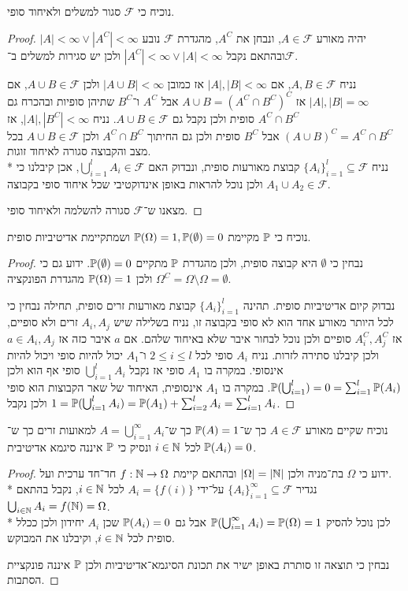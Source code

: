 \Subquestion{}
נוכיח כי $\mathcal{F}$ סגור למשלים ולאיחוד סופי.
\begin{proof}
	יהיה מאורע $A \in \mathcal{F}$, ונבחן את $A^C$, מהגדרת $\mathcal{F}$ נובע $|A| < \infty \lor |A^C| < \infty$ ובהתאם נקבל $|A^C| < \infty \lor |A| < \infty$ ולכן יש סגירות למשלים ב־$\mathcal{F}$.

	נניח $A, B \in \mathcal{F}$, אם $|A|, |B| < \infty$ אז כמובן $|A \cup B| < \infty$ ולכן $A \cup B \in \mathcal{F}$,
	אם $|A|, |B| = \infty$ אז $A \cup B = {(A^C \cap B^C)}^C$ אבל $A^C$ ו־$B^C$ שתיהן סופיות ובהכרח גם $A^C \cap B^C$ סופית ולכן נקבל גם $A \cup B \in \mathcal{F}$.
	נניח $|A|, |B^C| < \infty$, אז ${(A \cup B)}^C = A^C \cap B^C$ אבל $B^C$ סופית ולכן גם החיתוך $A^C \cap B^C$ ולכן $A \cup B \in \mathcal{F}$ בכל מצב והקבוצה סגורה לאיחוד זוגות. \\*
	נניח ${\{A_i\}}_{i = 1}^l \subseteq \mathcal{F}$ קבוצת מאורעות סופית, ונבדוק האם $\bigcup_{i = 1}^l A_i \in \mathcal{F}$, אכן קיבלנו כי $A_1 \cup A_2 \in \mathcal{F}$ ולכן נוכל להראות באופן אינדוקטיבי שכל איחוד סופי בקבוצה.

	מצאנו ש־$\mathcal{F}$ סגורה להשלמה ולאיחוד סופי.
\end{proof}

\Subquestion{}
נוכיח כי $\mathbb{P}$ מקיימת $\mathbb{P}(\Omega) = 1, \mathbb{P}(\emptyset) = 0$ ושמתקיימת אדיטיביות סופית.
\begin{proof}
	נבחין כי $\emptyset$ היא קבוצה סופית, ולכן מהגדרת $\mathbb{P}$ מתקיים $\mathbb{P}(\emptyset) = 0$.
	ידוע גם כי $\Omega^C = \Omega \setminus \Omega = \emptyset$ ולכן $\mathbb{P}(\Omega) = 1$ מהגדרת הפונקציה.

	נבדוק קיום אדיטיביות סופית.
	תהינה ${\{A_i\}}_{i = 1}^l$ קבוצת מאורעות זרים סופית, תחילה נבחין כי לכל היותר מאורע אחד הוא לא סופי בקבוצה זו, נניח בשלילה שיש $A_i, A_j$ זרים ולא סופיים, אז $A_i^C, A_j^C$ סופיים ולכן נוכל לבחור איבר שלא באיחוד שלהם.
	אם $a$ איבר כזה אז $a \in A_i, A_j$ ולכן קיבלנו סתירה לזרות. נניח $A_i$ סופי לכל $2 \le i \le l$ ו־$A_1$ יכול להיות סופי ויכול להיות אינסופי.
	במקרה בו $A_1$ סופי אז נקבל $\bigcup_{i = 1}^l A_i$ סופי אף הוא ולכן $\mathbb{P}(\bigcup_{i = 1}^l) = 0 = \sum_{i = 1}^l \mathbb{P}(A_i)$.
	במקרה בו $A_1$ אינסופית, האיחוד של שאר הקבוצות הוא סופי ולכן נקבל $1 = \mathbb{P}(\bigcup_{i = 1}^l A_i) = \mathbb{P}(A_1) + \sum_{i = 2}^l A_i = \sum_{i = 1}^l A_i$.
\end{proof}

\Subquestion{}
נוכיח שקיים מאורע $A \in \mathcal{F}$ כך ש־$\mathbb{P}(A) = 1$ כך ש־$A = \bigcup_{i = 1}^\infty A_i$ למאועות זרים כך ש־$\mathbb{P}(A_i) = 0$ לכל $i \in \mathbb{N}$ ונסיק כי $\mathbb{P}$ איננה סיגמא אדיטיבית.
\begin{proof}
	ידוע כי $\Omega$ בת־מניה ולכן $|\Omega| = |\mathbb{N}|$ ובהתאם קיימת $f : \mathbb{N} \to \Omega$ חד־חד ערכית ועל. \\*
	נגדיר ${\{A_i\}}_{i = 1}^\infty \subseteq \mathcal{F}$ על־ידי $A_i = \{ f(i) \}$ לכל $i \in \mathbb{N}$, נקבל בהתאם $\bigcup_{i \in \mathbb{N}} A_i = f(\mathbb{N}) = \Omega$. \\*
	לכן נוכל להסיק $\mathbb{P}(\bigcup_{i = 1}^\infty A_i) = \mathbb{P}(\Omega) = 1$ אבל גם $\mathbb{P}(A_i) = 0$ שכן $A_i$ יחידון ולכן ככלל סופית לכל $i \in \mathbb{N}$, וקיבלנו את המבוקש.

	נבחין כי תוצאה זו סותרת באופן ישיר את תכונת הסיגמא־אדיטיביות ולכן $\mathbb{P}$ איננה פונקציית הסתבות.
\end{proof}

